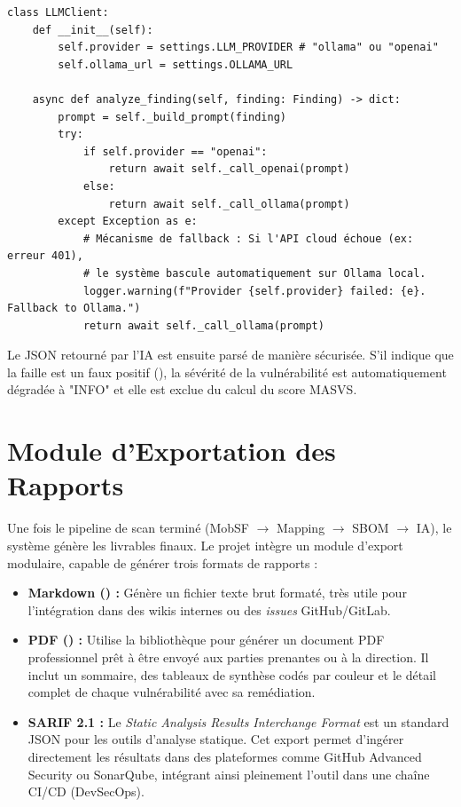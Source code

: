 \begin{tcolorbox}[codebox, title={Extrait : Logique de Fallback (llm\_triage.py)}]
\begin{verbatim}
class LLMClient:
    def __init__(self):
        self.provider = settings.LLM_PROVIDER # "ollama" ou "openai"
        self.ollama_url = settings.OLLAMA_URL

    async def analyze_finding(self, finding: Finding) -> dict:
        prompt = self._build_prompt(finding)
        try:
            if self.provider == "openai":
                return await self._call_openai(prompt)
            else:
                return await self._call_ollama(prompt)
        except Exception as e:
            # Mécanisme de fallback : Si l'API cloud échoue (ex: erreur 401),
            # le système bascule automatiquement sur Ollama local.
            logger.warning(f"Provider {self.provider} failed: {e}. Fallback to Ollama.")
            return await self._call_ollama(prompt)
\end{verbatim}
\end{tcolorbox}

Le JSON retourné par l'IA est ensuite parsé de manière sécurisée. S'il indique que la faille est un faux positif (), la sévérité de la vulnérabilité est automatiquement dégradée à "INFO" et elle est exclue du calcul du score MASVS.

\section{Module d'Exportation des Rapports}
Une fois le pipeline de scan terminé (MobSF $\rightarrow$ Mapping $\rightarrow$ SBOM $\rightarrow$ IA), le système génère les livrables finaux. Le projet intègre un module d'export modulaire, capable de générer trois formats de rapports :

\begin{itemize}[label=\textcolor{PrimaryBlue}{\faFileExport}]
    \item \textbf{Markdown () :} Génère un fichier texte brut formaté, très utile pour l'intégration dans des wikis internes ou des \textit{issues} GitHub/GitLab.
    \item \textbf{PDF () :} Utilise la bibliothèque  pour générer un document PDF professionnel prêt à être envoyé aux parties prenantes ou à la direction. Il inclut un sommaire, des tableaux de synthèse codés par couleur et le détail complet de chaque vulnérabilité avec sa remédiation.
    \item \textbf{SARIF 2.1 :} Le \textit{Static Analysis Results Interchange Format} est un standard JSON pour les outils d'analyse statique. Cet export permet d'ingérer directement les résultats dans des plateformes comme GitHub Advanced Security ou SonarQube, intégrant ainsi pleinement l'outil dans une chaîne CI/CD (DevSecOps).
\end{itemize}

